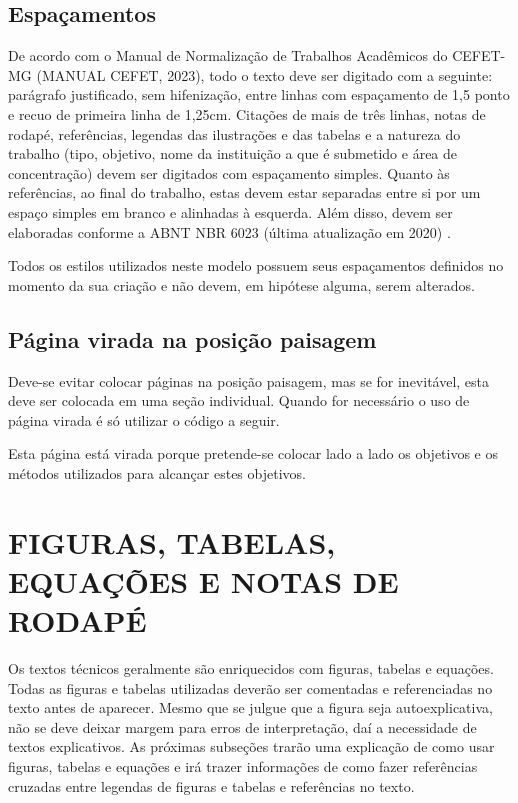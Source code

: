 \documentclass[
        oneside,      %
        english,			
        brazil			 
        ]{configcefetmglpd}
\begin{document}
\section{Espaçamentos}

De acordo com o Manual de Normalização de Trabalhos Acadêmicos do CEFET-MG (MANUAL CEFET, 2023), todo o texto deve ser 
digitado com a seguinte: parágrafo justificado, sem hifenização, entre linhas com espaçamento de 1,5 ponto e recuo de primeira 
linha de 1,25cm. Citações de mais de três linhas, notas de rodapé, referências, legendas das ilustrações e 
das tabelas e a natureza do trabalho (tipo, objetivo, nome da instituição a que é submetido e área de concentração) devem ser 
digitados com espaçamento simples. Quanto às referências, ao final do trabalho, estas devem estar separadas entre si por um espaço 
simples em branco e alinhadas à esquerda. Além disso, devem ser elaboradas conforme a ABNT NBR 6023 (última atualização em 2020) 
\cite{bib:abnt6023}.

Todos os estilos utilizados neste modelo possuem seus espaçamentos definidos no momento da sua criação e não devem, 
em hipótese alguma, serem alterados.

\section{Página virada na posição paisagem} 
Deve-se evitar colocar páginas na posição paisagem, mas se for inevitável, esta deve ser colocada em uma seção individual. Quando for necessário o uso de página virada é só utilizar o código a seguir.

\begin{landscape}
Esta página está virada porque pretende-se colocar lado a lado os objetivos e os métodos utilizados para alcançar estes objetivos.
\end{landscape}

\chapter{FIGURAS, TABELAS, EQUAÇÕES E NOTAS DE RODAPÉ} \label{cap:fig_tab_eq}
Os textos técnicos geralmente são enriquecidos com figuras, tabelas e equações. Todas as figuras e tabelas utilizadas deverão ser comentadas e referenciadas no texto antes de aparecer. Mesmo que se julgue que a figura seja autoexplicativa, não se deve deixar margem para erros de interpretação, daí a necessidade de textos explicativos. As próximas subseções trarão uma explicação de como usar figuras, tabelas e equações e irá trazer informações de como fazer referências cruzadas entre legendas de figuras e tabelas e referências no texto.
\end{document}
